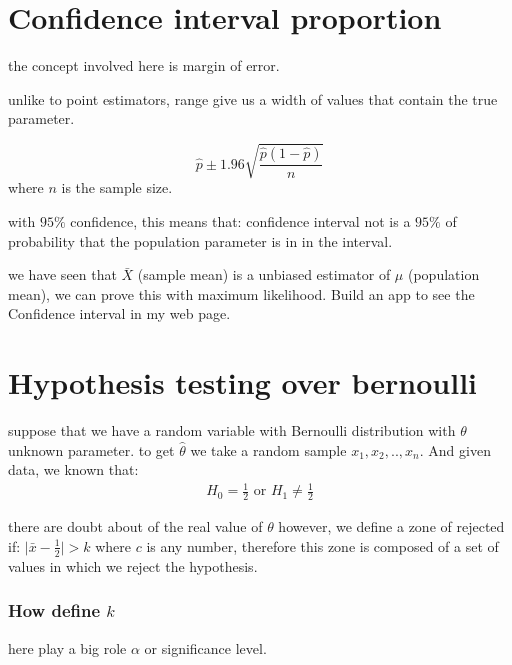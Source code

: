 \documentclass[10pt,a4paper]{article}
\begin{document}
\section{Confidence interval proportion}
the concept involved here is margin of error.


unlike to point estimators, range give us a width of values that contain  the true parameter.


\begin{equation}
\hat{p} \pm 1.96 \sqrt{\frac{\hat{p} (1-\hat{p})}{n}}
\end{equation}
where $n$ is the sample size.

with $95\%$ confidence, this means that: 
confidence interval not is a $95\%$ of probability that the population parameter is in in the interval.


we have seen that $\bar{X}$ (sample mean) is a unbiased estimator of $\mu$ (population mean), we can prove this with maximum likelihood. 
Build an app to see the Confidence interval in my web page.







\begin{comment}
toodler: 
convey: transmitir, comunicar.
trustworthy: confiable
vanish:
\end{comment}




\section{Hypothesis testing over bernoulli}
suppose that we have a random variable with  Bernoulli distribution with $\theta$ unknown parameter.
to get $\hat{\theta}$ we take a random sample $x_{1},x_{2},..,x_{n}$. And given data, we known that:
\begin{equation}
\begin{align*}
H_{0} = \frac{1}{2}  \mbox{ or } H_{1} \neq \frac{1}{2}
\end{align*}
\end{equation}

there are doubt about of the real value of $\theta$ however, we define a zone of rejected if:
$ \vert \bar{x} - \frac{1}{2} \vert > k$
where $c$ is any number, therefore this zone is composed of a set of values in which we reject the hypothesis.


\subsubsection{How define $k$}
here play a big role $\alpha$ or significance level.
\end{document}
